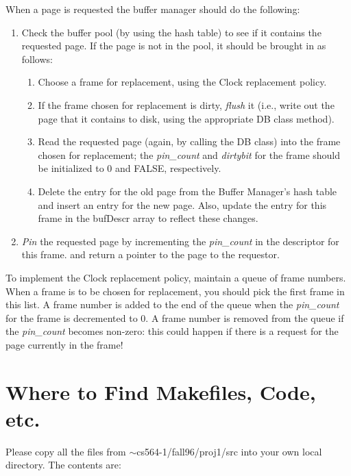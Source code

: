 When a page is requested the buffer manager should do the following:
\begin{enumerate}
\item
Check the buffer pool (by using the hash table) to see if it contains the requested page.
If the page is not in the pool, it should be brought in as follows:
\begin{enumerate}
\item
Choose a frame for replacement,
using the Clock replacement policy.
\item
If the frame chosen for replacement is dirty, 
{\em flush} it (i.e., write out the page that it contains to disk,
using the appropriate DB class method).
\item
Read the requested page (again, by calling the DB class) into the frame chosen for replacement; the 
{\em pin\_count} and {\em dirtybit} for the frame
should be initialized to 0 and FALSE, respectively.
\item
Delete the entry for the old page from the Buffer Manager's hash table and insert
an entry for the new page.
Also, update the entry for this frame in the bufDescr array to reflect these changes.
\end{enumerate}
\item
{\em Pin} the requested page by incrementing the {\em pin\_count} in the descriptor
for this frame.
and return a pointer to the page to the requestor.  
\end{enumerate}

To implement the Clock replacement policy, maintain a 
queue of frame numbers.
When a frame is to be chosen for replacement, you should pick the first frame 
in this list.
A frame number is added to the end of the queue when the {\em pin\_count} for
the frame is decremented to 0.
A frame number is removed from the queue if the {\em pin\_count} becomes
non-zero:  this could happen if there is a request for the page currently in
the frame!


\section{Where to Find Makefiles, Code, etc.}


Please copy all the files from $\sim$cs564-1/fall96/proj1/src
into your own local directory. The contents are:


